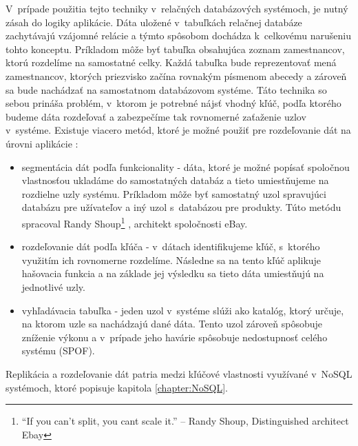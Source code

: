 \documentclass[11pt,twoside,a4paper]{book}
\begin{document}
V~prípade použitia tejto techniky v~relačných databázových systémoch, je nutný zásah do logiky aplikácie. Dáta uložené v~tabuľkách relačnej databáze zachytávajú vzájomné relácie a týmto spôsobom dochádza k~celkovému narušeniu tohto konceptu. Príkladom môže byť tabuľka obsahujúca zoznam zamestnancov, ktorú rozdelíme na samostatné celky. Každá tabuľka bude reprezentovať mená zamestnancov, ktorých priezvisko začína rovnakým písmenom abecedy a zároveň sa bude nachádzať na samostatnom databázovom systéme. Táto technika so sebou prináša problém, v~ktorom je potrebné nájsť vhodný kľúč, podľa ktorého budeme dáta rozdeľovať a zabezpečíme tak rovnomerné zaťaženie uzlov v~systéme. Existuje viacero metód, ktoré je možné použiť pre rozdeľovanie dát na úrovni aplikácie \cite{hewitt2010cassandra}:
\begin{itemize}
 \item 
      segmentácia dát podľa funkcionality - dáta, ktoré je možné popísať spoločnou vlastnosťou ukladáme do samostatných databáz a tieto umiestňujeme na rozdielne uzly systému. Príkladom môže byť samostatný uzol spravujúci databázu pre užívateľov a iný uzol s~databázou pre produkty. Túto metódu spracoval Randy Shoup\footnote{“If you can’t split, you cant scale it.” -- Randy Shoup, Distinguished architect Ebay} \cite{ebayShard}, architekt spoločnosti eBay.
  \item
      rozdeľovanie dát podľa kľúča - v~dátach identifikujeme kľúč, s~ktorého využitím ich rovnomerne rozdelíme. Následne sa na tento kľúč aplikuje hašovacia funkcia a na základe jej výsledku sa tieto dáta umiestňujú na jednotlivé uzly.
  \item
      vyhľadávacia tabuľka - jeden uzol v~systéme slúži ako katalóg, ktorý určuje, na ktorom uzle sa nachádzajú dané dáta. Tento uzol zároveň spôsobuje zníženie výkonu a v~prípade jeho havárie spôsobuje nedostupnosť celého systému (SPOF).
\end{itemize}

Replikácia a rozdeľovanie dát patria medzi kľúčové vlastnosti využívané v~NoSQL systémoch, ktoré popisuje kapitola \ref{chapter:NoSQL}.


\end{document}
